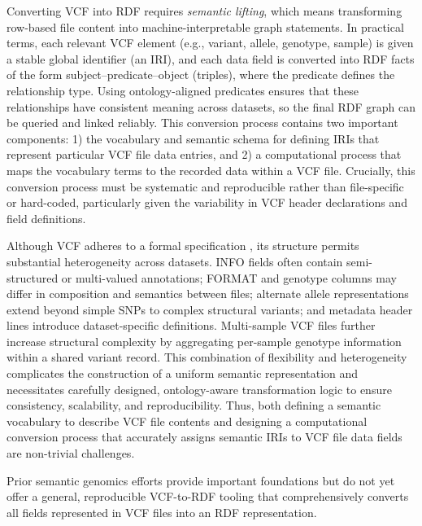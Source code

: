 \documentclass[unnumsec,webpdf,contemporary,large]{oup-authoring-template}
\begin{document}
Converting VCF into RDF requires \textit{semantic lifting}, which means transforming row-based file content into machine-interpretable graph statements.
In practical terms, each relevant VCF element (e.g., variant, allele, genotype, sample) is given a stable global identifier (an IRI), and each data field is converted into RDF facts of the form subject--predicate--object (triples), where the predicate defines the relationship type.
Using ontology-aligned predicates ensures that these relationships have consistent meaning across datasets, so the final RDF graph can be queried and linked reliably.
This conversion process contains two important components: 1) the vocabulary and semantic schema for defining IRIs that represent particular VCF file data entries, and 2) a computational process that maps the vocabulary terms to the recorded data within a VCF file.
Crucially, this conversion process must be systematic and reproducible rather than file-specific or hard-coded, particularly given the variability in VCF header declarations and field definitions.

Although VCF adheres to a formal specification \cite{vcf_spec_2024}, its structure permits substantial heterogeneity across datasets. 
INFO fields often contain semi-structured or multi-valued annotations; FORMAT and genotype columns may differ in composition and semantics between files; alternate allele representations extend beyond simple SNPs to complex structural variants; and metadata header lines introduce dataset-specific definitions. 
Multi-sample VCF files further increase structural complexity by aggregating per-sample genotype information within a shared variant record.
This combination of flexibility and heterogeneity complicates the construction of a uniform semantic representation and necessitates carefully designed, ontology-aware transformation logic to ensure consistency, scalability, and reproducibility.
Thus, both defining a semantic vocabulary to describe VCF file contents and designing a computational conversion process that accurately assigns semantic IRIs to VCF file data fields are non-trivial challenges.

Prior semantic genomics efforts provide important foundations but do not yet offer a general, reproducible VCF-to-RDF tooling that comprehensively converts all fields represented in VCF files into an RDF representation.
\end{document}
